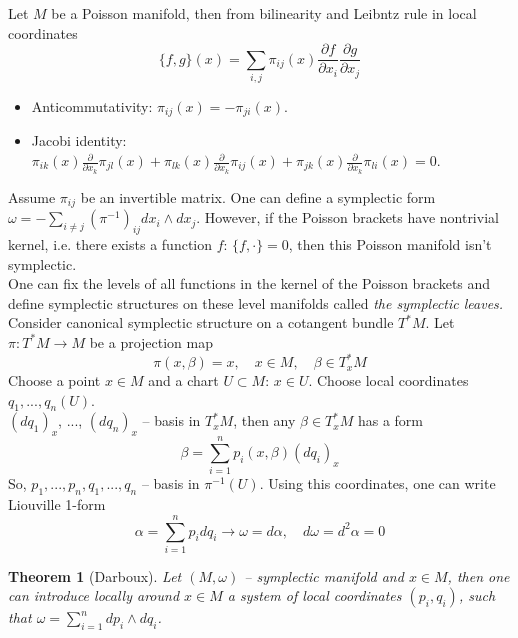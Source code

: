 \documentclass[12pt]{article}
\newtheorem{theorem}{Theorem}[]
\theoremstyle{definition}
\begin{document}
Let $M$ be a Poisson manifold, then from bilinearity and Leibntz rule in local coordinates
\begin{equation}
    \{f,g\}(x)=\sum\limits_{i,j}\pi_{ij}(x)\frac{\partial f}{\partial x_i}\frac{\partial g}{\partial x_j}
\end{equation}
\begin{itemize}
    \item Anticommutativity: $\pi_{ij}(x)=-\pi_{ji}(x)$.
    \item Jacobi identity: $\pi_{ik}(x)\frac{\partial}{\partial x_k}\pi_{jl}(x)+\pi_{lk}(x)\frac{\partial}{\partial x_k}\pi_{ij}(x)+\pi_{jk}(x)\frac{\partial}{\partial x_k}\pi_{li}(x)=0$.
\end{itemize}
Assume $\pi_{ij}$ be an invertible matrix. One can define a symplectic form $\omega=-\sum\limits_{i\neq j}(\pi^{-1})_{ij}dx_i\wedge dx_j$. However, if the Poisson brackets have nontrivial kernel, i.e. there exists a function $f$: $\{f,\cdot\}=0$, then this Poisson manifold isn't symplectic.\\
One can fix the levels of all functions in the kernel of the Poisson brackets and define symplectic structures on these level manifolds called \textit{the symplectic leaves.}\\
Consider canonical symplectic structure on a cotangent bundle $T^*M$. Let $\pi:T^*M\rightarrow M$ be a projection map
\begin{equation}
    \pi(x,\beta)=x,\quad x\in M,\quad\beta\in T^*_xM
\end{equation}
Choose a point $x\in M$ and a chart $U\subset M$: $x\in U$. Choose local coordinates $q_1,...,q_n(U)$.\\ $(dq_1)_x$, ..., $(dq_n)_x$ -- basis in $T^*_xM$, then any $\beta\in T^*_xM$ has a form
\begin{equation}
    \beta=\sum\limits_{i=1}^np_i(x,\beta)(dq_i)_x
\end{equation}
So, $p_1,...,p_n, q_1, ..., q_n$ -- basis in $\pi^{-1}(U)$. Using this coordinates, one can write Liouville 1-form %
\begin{equation}
    \alpha=\sum\limits_{i=1}^np_idq_i\rightarrow\omega=d\alpha,\quad d\omega=d^2\alpha=0
\end{equation}
\begin{theorem}[Darboux]
    Let $(M,\omega)$ -- symplectic manifold and $x\in M$, then one can introduce locally around $x\in M$ a system of local coordinates $(p_i,q_i)$, such that $\omega=\sum\limits_{i=1}^ndp_i\wedge dq_i$.
\end{theorem}
\end{document}
